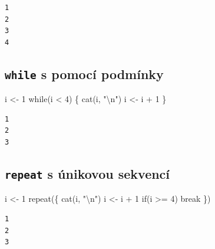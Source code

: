 \documentclass[
  letterpaper,
  DIV=11,
  numbers=noendperiod]{scrreprt}
\newenvironment{Shaded}{\begin{snugshade}}{\end{snugshade}}
\newcommand{\ControlFlowTok}[1]{\textcolor[rgb]{0.00,0.23,0.31}{#1}}
\newcommand{\DecValTok}[1]{\textcolor[rgb]{0.68,0.00,0.00}{#1}}
\newcommand{\FunctionTok}[1]{\textcolor[rgb]{0.28,0.35,0.67}{#1}}
\newcommand{\NormalTok}[1]{\textcolor[rgb]{0.00,0.23,0.31}{#1}}
\newcommand{\OtherTok}[1]{\textcolor[rgb]{0.00,0.23,0.31}{#1}}
\newcommand{\SpecialCharTok}[1]{\textcolor[rgb]{0.37,0.37,0.37}{#1}}
\newcommand{\StringTok}[1]{\textcolor[rgb]{0.13,0.47,0.30}{#1}}
\begin{document}
\begin{verbatim}
1 
2 
3 
4 
\end{verbatim}

\hypertarget{while-s-pomocuxed-podmuxednky}{%
\subsection{\texorpdfstring{\texttt{while} s pomocí
podmínky}{while s pomocí podmínky}}\label{while-s-pomocuxed-podmuxednky}}

\begin{Shaded}
\begin{Highlighting}[]
\NormalTok{i }\OtherTok{\textless{}{-}} \DecValTok{1}
\ControlFlowTok{while}\NormalTok{(i }\SpecialCharTok{\textless{}} \DecValTok{4}\NormalTok{) \{}
  \FunctionTok{cat}\NormalTok{(i, }\StringTok{"}\SpecialCharTok{\textbackslash{}n}\StringTok{"}\NormalTok{)}
\NormalTok{  i }\OtherTok{\textless{}{-}}\NormalTok{ i }\SpecialCharTok{+} \DecValTok{1}
\NormalTok{\}}
\end{Highlighting}
\end{Shaded}

\begin{verbatim}
1 
2 
3 
\end{verbatim}

\hypertarget{repeat-s-uxfanikovou-sekvencuxed}{%
\subsection{\texorpdfstring{\texttt{repeat} s únikovou
sekvencí}{repeat s únikovou sekvencí}}\label{repeat-s-uxfanikovou-sekvencuxed}}

\begin{Shaded}
\begin{Highlighting}[]
\NormalTok{i }\OtherTok{\textless{}{-}} \DecValTok{1}
\ControlFlowTok{repeat}\NormalTok{(\{}
  \FunctionTok{cat}\NormalTok{(i, }\StringTok{"}\SpecialCharTok{\textbackslash{}n}\StringTok{"}\NormalTok{)}
\NormalTok{  i }\OtherTok{\textless{}{-}}\NormalTok{ i }\SpecialCharTok{+} \DecValTok{1}
  \ControlFlowTok{if}\NormalTok{(i }\SpecialCharTok{\textgreater{}=} \DecValTok{4}\NormalTok{) }\ControlFlowTok{break}
\NormalTok{\})}
\end{Highlighting}
\end{Shaded}

\begin{verbatim}
1 
2 
3 
\end{verbatim}
\end{document}
